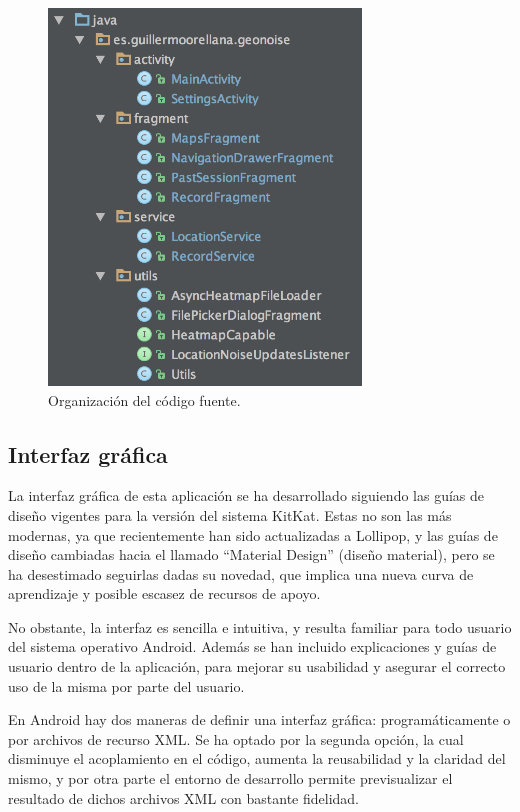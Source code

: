  \begin{figure}[h] \centering
    \includegraphics[height=10cm]{graphs/srctree.png} \caption{Organización del código fuente.}\label{fig:srctree}
\end{figure}
 
\subsection{Interfaz gráfica}

La interfaz gráfica de esta aplicación se ha desarrollado siguiendo las guías de diseño vigentes para la versión del sistema KitKat. Estas no son las más modernas, ya que recientemente han sido actualizadas a Lollipop, y las guías de diseño cambiadas hacia el llamado “Material Design” (diseño material), pero se ha desestimado seguirlas dadas su novedad, que implica una nueva curva de aprendizaje y posible escasez de recursos de apoyo.

No obstante, la interfaz es sencilla e intuitiva, y resulta familiar para todo usuario del sistema operativo Android. Además se han incluido explicaciones y guías de usuario dentro de la aplicación, para mejorar su usabilidad y asegurar el correcto uso de la misma por parte del usuario.

En Android hay dos maneras de definir una interfaz gráfica: programáticamente o por archivos de recurso XML. Se ha optado por la segunda opción, la cual disminuye el acoplamiento en el código, aumenta la reusabilidad y la claridad del mismo, y por otra parte el entorno de desarrollo permite previsualizar el resultado de dichos archivos XML con bastante fidelidad.

